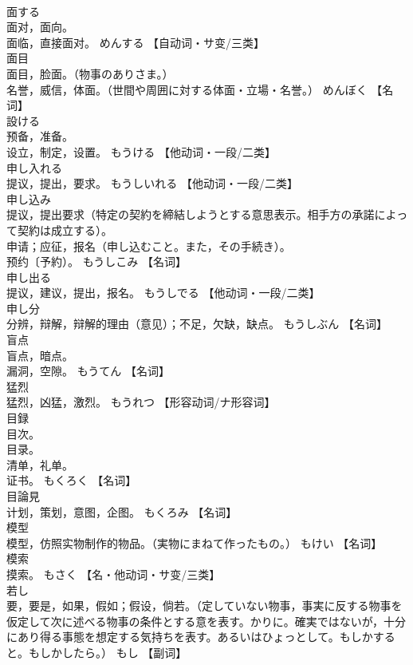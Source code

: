 \documentclass[8pt]{extreport}
\begin{document}
\begin{CJK}{UTF8}{min}
\\	面する	
\\	面对，面向。 
\\	面临，直接面对。	めんする		【自动词・サ变/三类】
\\	面目	
\\	面目，脸面。（物事のありさま。） 
\\	名誉，威信，体面。（世間や周囲に対する体面・立場・名誉。）	めんぼく		【名词】
\\	設ける	
\\	预备，准备。 
\\	设立，制定，设置。	もうける		【他动词・一段/二类】
\\	申し入れる	
\\	提议，提出，要求。	もうしいれる		【他动词・一段/二类】
\\	申し込み	
\\	提议，提出要求（特定の契約を締結しようとする意思表示。相手方の承諾によって契約は成立する）。 
\\	申请；应征，报名（申し込むこと。また，その手続き）。 
\\	预约〔予約）。	もうしこみ		【名词】
\\	申し出る	
\\	提议，建议，提出，报名。	もうしでる		【他动词・一段/二类】
\\	申し分	
\\	分辨，辩解，辩解的理由（意见）；不足，欠缺，缺点。	もうしぶん		【名词】
\\	盲点	
\\	盲点，暗点。 
\\	漏洞，空隙。	もうてん		【名词】
\\	猛烈	
\\	猛烈，凶猛，激烈。	もうれつ		【形容动词/ナ形容词】
\\	目録	
\\	目次。 
\\	目录。 
\\	清单，礼单。 
\\	证书。	もくろく		【名词】
\\	目論見	
\\	计划，策划，意图，企图。	もくろみ		【名词】
\\	模型	
\\	模型，仿照实物制作的物品。（実物にまねて作ったもの。）	もけい		【名词】
\\	模索	
\\	摸索。	もさく		【名・他动词・サ变/三类】
\\	若し	
\\	要，要是，如果，假如；假设，倘若。（定していない物事，事実に反する物事を仮定して次に述べる物事の条件とする意を表す。かりに。確実ではないが，十分にあり得る事態を想定する気持ちを表す。あるいはひょっとして。もしかすると。もしかしたら。）	もし		【副词】

\end{CJK}
\end{document}
